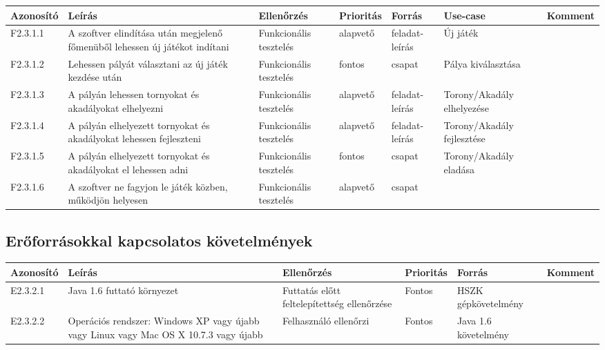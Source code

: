 \begin{longtable}{| l | p{2.5cm} | p{2.5cm} | l | p{1.5cm} | p{2.5cm} | l |}
\hline
\textbf{Azonosító}   & \textbf{Leírás} & \textbf{Ellenőrzés} & \textbf{Prioritás} & \textbf{Forrás} & \textbf{Use-case} & \textbf{Komment} \tabularnewline
\hline\hline
F2.3.1.1	
&
A szoftver elindítása után megjelenő főmenüből lehessen új játékot indítani	
&
Funkcionális tesztelés	
&
alapvető
&
feladat-leírás
&
Új játék
&	
\tabularnewline
\hline
F2.3.1.2
&
Lehessen pályát választani az új játék kezdése után
&
Funkcionális tesztelés
&
fontos
&
csapat
&
Pálya kiválasztása
&
\tabularnewline
\hline
F2.3.1.3
&
A pályán lehessen tornyokat és akadályokat elhelyezni
&
Funkcionális tesztelés
&
alapvető
&
feladat-leírás
&
Torony/Akadály elhelyezése
&
\tabularnewline
\hline
F2.3.1.4
&
A pályán elhelyezett tornyokat és akadályokat lehessen fejleszteni
&
Funkcionális tesztelés
&
alapvető
&
feladat-leírás&
Torony/Akadály fejlesztése
&
\tabularnewline
\hline
F2.3.1.5
&
A pályán elhelyezett tornyokat és akadályokat el lehessen adni
&
Funkcionális tesztelés
&
fontos
&
csapat
&
Torony/Akadály eladása	
&
\tabularnewline
\hline
F2.3.1.6
&
A szoftver ne fagyjon le játék közben, működjön helyesen
&
Funkcionális tesztelés
&
alapvető
&
csapat
&
&
\tabularnewline
\hline

\end{longtable}

\subsection{Erőforrásokkal kapcsolatos követelmények}


\begin{longtable}{| l | p{3.5cm} | p{3.5cm} | l | p{2.5cm} | l |}
\hline
\textbf{Azonosító}   & \textbf{Leírás} & \textbf{Ellenőrzés} & \textbf{Prioritás} & \textbf{Forrás} & \textbf{Komment} \tabularnewline
\hline\hline
E2.3.2.1
&
Java 1.6 futtató környezet
&
Futtatás előtt feltelepítettség ellenőrzése
&
Fontos
&
HSZK gépkövetelmény
&
\tabularnewline
\hline
E2.3.2.2
&
Operációs rendszer: Windows XP vagy újabb vagy Linux vagy Mac OS X 10.7.3 vagy újabb
&
Felhasználó ellenőrzi
&
Fontos
&
Java 1.6 követelmény
&	

\tabularnewline
\hline

\end{longtable}

